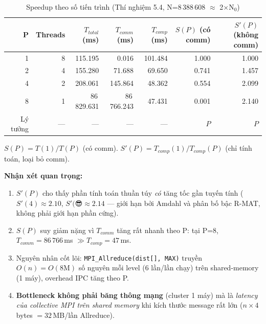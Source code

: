 \begin{table}[h]
\centering
\caption{Speedup theo số tiến trình (Thí nghiệm 5.4, N=8\,388\,608 $\approx$ 2$\times$N$_0$)}
\label{tab:speedup}
\begin{tabular}{rrrrrrr}
\hline
\textbf{P} &
\textbf{Threads} &
\textbf{$T_{total}$ (ms)} &
\textbf{$T_{comm}$ (ms)} &
\textbf{$T_{comp}$ (ms)} &
\textbf{$S(P)$ (có comm)} &
\textbf{$S'(P)$ (không comm)} \\
\hline
1 & 8 &    115.195 &     0.016 & 101.484 & 1.000 & 1.000 \\
2 & 4 &    155.280 &    71.688 &  69.650 & 0.741 & 1.457 \\
4 & 2 &    208.061 &   145.864 &  48.362 & 0.554 & 2.099 \\
8 & 1 & 86\,829.631 & 86\,766.243 &  47.431 & 0.001 & 2.140 \\
\hline
Lý tưởng & — & — & — & — & $P$ & $P$ \\
\hline
\end{tabular}
\begin{tablenotes}
\small
\item $S(P) = T(1)/T(P)$ (có comm).
      $S'(P) = T_{comp}(1)/T_{comp}(P)$ (chỉ tính toán, loại bỏ comm).
\item \textbf{Nhận xét quan trọng:}
  \begin{enumerate}
    \item $S'(P)$ cho thấy phần tính toán thuần túy \emph{có} tăng tốc gần tuyến tính
          ($S'(4) \approx 2.10$, $S'(😎 \approx 2.14$ — giới hạn bởi Amdahl và
          phân bố bậc R-MAT, không phải giới hạn phần cứng).
    \item $S(P)$ suy giảm nặng vì $T_{comm}$ tăng rất nhanh theo P:
          tại P=8, $T_{comm} = 86\,766$\,ms $\gg T_{comp} = 47$\,ms.
    \item Nguyên nhân cốt lõi: \texttt{MPI\_Allreduce(dist[], MAX)} truyền
          $O(n) = O(8\text{M})$ số nguyên mỗi level (6 lần/lần chạy)
          trên shared-memory (1 máy), overhead IPC tăng theo P.
    \item \textbf{Bottleneck không phải băng thông mạng} (cluster 1 máy)
          mà là \emph{latency của collective MPI trên shared memory} khi
          kích thước message rất lớn ($n \times 4$ bytes $= 32$\,MB/lần Allreduce).
  \end{enumerate}
\end{tablenotes}
\end{table}


